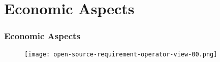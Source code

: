\section{Economic Aspects}

\begin{frame}
\frametitle{Economic Aspects}

\begin{center}
  \begin{figure}
    \texttt{[image: open-source-requirement-operator-view-00.png]}
  \end{figure}
\end{center}

\end{frame}
